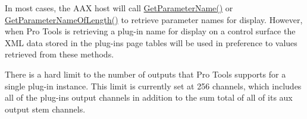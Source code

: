 \begin{DoxyRefList}
%
 In most cases, the AAX host will call \mbox{\hyperlink{a01953_a8f8ae4b4346e708ec6de612ef99e5a92}{Get\+Parameter\+Name()}} or \mbox{\hyperlink{a01953_a5d556ae1fa4617a6439ef347139d70eb}{Get\+Parameter\+Name\+Of\+Length()}} to retrieve parameter names for display. However, when Pro Tools is retrieving a plug-\/in name for display on a control surface the XML data stored in the plug-\/in\textquotesingle{}s page tables will be used in preference to values retrieved from these methods. 
\item[Member \mbox{\hyperlink{a02069_a76266e8a07ce20cdbe5721172c32a93d}{AAX\+\_\+\+IComponent\+Descriptor\+::Add\+Aux\+Output\+Stem}} (AAX\+\_\+\+CField\+Index in\+Field\+Index, int32\+\_\+t in\+Stem\+Format, const char in\+Name\+UTF8\mbox{[}\mbox{]})=0]\label{a00801__compatibility_notes000057}%
%
 There is a hard limit to the number of outputs that Pro Tools supports for a single plug-\/in instance. This limit is currently set at 256 channels, which includes all of the plug-\/in\textquotesingle{}s output channels in addition to the sum total of all of its aux output stem channels.


\end{DoxyRefList}
